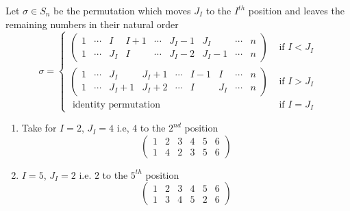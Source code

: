 \documentclass{article}
\numberwithin{equation}{section}
\begin{document}
Let $\sigma \in S_n$ be the permutation which moves $J_I$ to the $I^{th}$ position and leaves the remaining numbers in their natural order
\[
    \sigma = \begin{cases}
        \begin{pmatrix}
            1 & \cdots & I & I + 1 & \cdots & J_I - 1 & J_I & \cdots & n \\
            1 & \cdots & J_I & I & \cdots & J_I - 2 & J_I -1 & \cdots & n
        \end{pmatrix} & \text{ if } I < J_I \\[15pt]
        \begin{pmatrix}
            1 & \cdots & J_I & J_I + 1 & \cdots & I - 1 & I & \cdots & n \\
            1 & \cdots & J_I + 1 & J_I + 2 & \cdots & I & J_I & \cdots & n
        \end{pmatrix} & \text{ if } I > J_I \\[15pt]
        \text{ identity permutation } & \text{ if } I = J_I
    \end{cases}
\]
\begin{eg}\leavevmode
    \begin{enumerate}
        \item Take for $I = 2$, $J_I = 4$ i.e, $4$ to the $2^{nd}$ position
        \[
            \begin{pmatrix}
                1 & 2 & 3 & 4 & 5 & 6 \\
                1 & 4 & 2 & 3 & 5 & 6
            \end{pmatrix}
        \]
        \item $I = 5$, $J_I = 2$ i.e. $2$ to the $5^{th}$ position
        \[
            \begin{pmatrix}
                1 & 2 & 3 & 4 & 5 & 6 \\
                1 & 3 & 4 & 5 & 2 & 6
            \end{pmatrix}
        \]
    \end{enumerate}
\end{eg}

\end{document}
